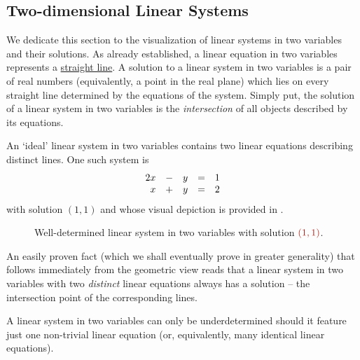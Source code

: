 \subsection{Two-dimensional Linear Systems}
\label{ssec:two-dimensional-linear-systems}

We dedicate this section to the visualization of linear systems in two variables
and their solutions. As already established, a linear equation in two variables
represents a \hyperref[def:straight-line]{straight line}. A solution to a linear
system in two variables is a pair of real numbers (equivalently, a point in the
real plane) which lies on every straight line determined by the equations of the
system. Simply put, the solution of a linear system in two variables is the
\emph{intersection} of all objects described by its equations.

An `ideal' linear system in two variables contains two linear equations
describing distinct lines. One such system is
\[
 \begin{array}{r c r c r}
  2x & - & y & = & 1\\
  x & + & y & = & 2
 \end{array}
\]
with solution $(1,1)$ and whose visual depiction is provided in
.

\begin{figure}[ht]
 \centering

 \caption{Well-determined linear system in two variables with solution
 $\clr{(1,1)}$.}
 \label{fig:well-determined-system}
\end{figure}

An easily proven fact (which we shall eventually prove in greater generality)
that follows immediately from the geometric view reads that a linear system in
two variables with two \emph{distinct} linear equations always has a solution --
the intersection point of the corresponding lines.

A linear system in two variables can only be underdetermined should it feature
just one non-trivial linear equation (or, equivalently, many identical linear
equations). 
